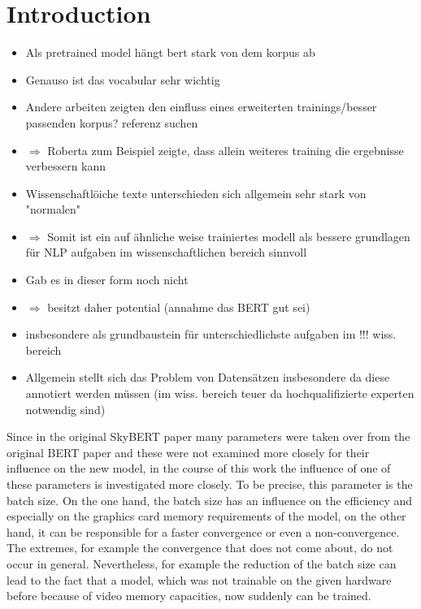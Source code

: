 \chapter{Introduction}
\color{ForestGreen}
\begin{itemize}
	\item Als pretrained model hängt bert stark von dem korpus ab
	\item Genauso ist das vocabular sehr wichtig
	\item Andere arbeiten zeigten den einfluss eines erweiterten trainings/besser passenden korpus? referenz suchen
	\item $\Longrightarrow$ Roberta zum Beispiel zeigte, dass allein weiteres training die ergebnisse verbessern kann
	\item Wissenschaftlöiche texte unterschieden sich allgemein sehr stark von "normalen"
	\item $\Rightarrow$ Somit ist ein auf ähnliche weise trainiertes modell als bessere grundlagen für NLP aufgaben im wissenschaftlichen bereich sinnvoll
	\item Gab es in dieser form noch nicht
	\item $\Rightarrow$ besitzt daher potential (annahme das BERT gut sei)
	\item insbesondere als grundbaustein für unterschiedlichste aufgaben im !!! wiss. bereich
	\item Allgemein stellt sich das Problem von Datensätzen insbesondere da diese annotiert werden müssen (im wiss. bereich teuer da hochqualifizierte experten notwendig sind)
\end{itemize}
\color{black}
\color{red}
Since in the original SkyBERT paper many parameters were taken over from the original BERT paper and these were not examined more closely for their influence on the new model, in the course of this work the influence of one of these parameters is investigated more closely. To be precise, this parameter is the batch size. On the one hand, the batch size has an influence on the efficiency and especially on the graphics card memory requirements of the model, on the other hand, it can be responsible for a faster convergence or even a non-convergence. The extremes, for example the convergence that does not come about, do not occur in general. Nevertheless, for example the reduction of the batch size can lead to the fact that a model, which was not trainable on the given hardware before because of video memory capacities, now suddenly can be trained.
\color{black}